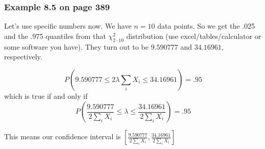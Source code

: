 \documentclass{beamer}
\begin{document}
\begin{frame}
\frametitle{Example 8.5 on page 389}

Let's use specific numbers now. We have $n = 10$ data points. So we get the .025 and the .975 quantiles from that $\chi^2_{2\cdot 10}$ distribution (use excel/tables/calculator or some software you have). They turn out to be $9.590777$ and $34.16961$, respectively.
\newline

\[
P(9.590777 \le 2 \lambda \sum_i X_i \le 34.16961) = .95
\]
which is true if and only if
\[
P\left(\frac{9.590777}{2 \sum_i X_i} \le  \lambda  \le \frac{34.16961}{2 \sum_i X_i}\right) = .95
\]

This means our confidence interval is $[\frac{9.590777}{2 \sum_i X_i}, \frac{34.16961}{2 \sum_i X_i}]$
\end{frame}
\end{document}
